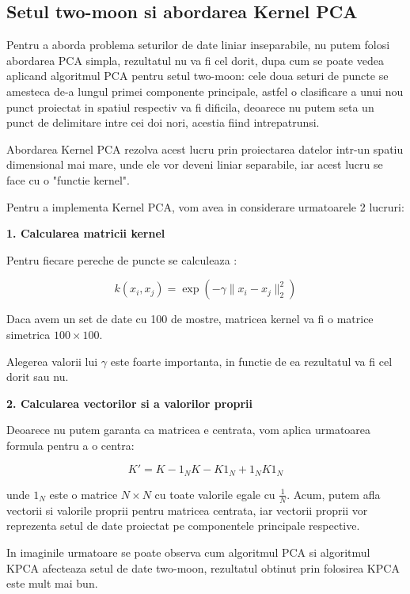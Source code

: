 \documentclass[12pt]{article}
\begin{document}
\subsection{Setul two-moon si abordarea Kernel PCA}
Pentru a aborda problema seturilor de date liniar inseparabile, nu putem folosi abordarea PCA simpla, rezultatul nu va fi cel dorit, dupa cum se poate vedea aplicand algoritmul PCA pentru setul two-moon: cele doua seturi de puncte se amesteca de-a lungul primei componente principale, astfel o clasificare a unui nou punct proiectat in spatiul respectiv va fi dificila, deoarece nu putem seta un punct de delimitare intre cei doi nori, acestia fiind intrepatrunsi.

Abordarea Kernel PCA rezolva acest lucru prin proiectarea datelor intr-un spatiu dimensional mai mare, unde ele vor deveni liniar separabile, iar acest lucru se face cu o "functie kernel".

Pentru a implementa Kernel PCA, vom avea in considerare urmatoarele 2 lucruri:

\textbf{1. Calcularea matricii kernel} 

Pentru fiecare pereche de puncte se calculeaza :

\begin{equation}
k(x_i,x_j)=\exp(-\gamma \|x_i - x_j\|_2^2)
\end{equation}

Daca avem un set de date cu 100 de mostre, matricea kernel va fi o matrice simetrica $100 \times 100$.

Alegerea valorii lui $\gamma$ este foarte importanta, in functie de ea rezultatul va fi cel dorit sau nu.

\textbf{2. Calcularea vectorilor si a valorilor proprii}

Deoarece nu putem garanta ca matricea e centrata, vom aplica urmatoarea formula pentru a o centra: 

\begin{equation}
K'=K-1_NK-K1_N+1_NK1_N
\end{equation}

unde $1_N$ este o matrice $N \times N$ cu toate valorile egale cu $\frac{1}{N}$.
Acum, putem afla vectorii si valorile proprii pentru matricea centrata, iar vectorii proprii vor reprezenta setul de date proiectat pe componentele principale respective.

In imaginile urmatoare se poate observa cum algoritmul PCA si algoritmul KPCA afecteaza setul de date two-moon, rezultatul obtinut prin folosirea KPCA este mult mai bun. 
\end{document}
